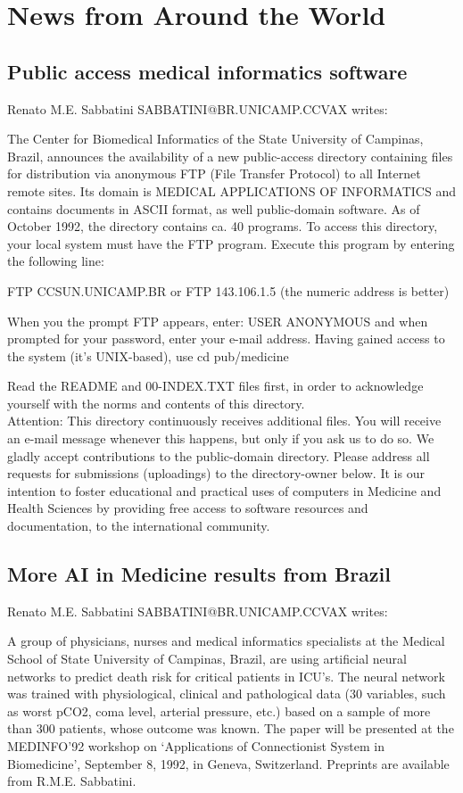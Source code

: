 \section{News from Around the World}
\subsection{Public access medical informatics software}
Renato M.E. Sabbatini SABBATINI@BR.UNICAMP.CCVAX writes:
 
The Center for Biomedical Informatics of the State University of
Campinas, Brazil, announces the availability of a new public-access
directory containing files for distribution via anonymous FTP (File Transfer
Protocol) to all Internet remote sites.
Its domain is MEDICAL APPLICATIONS OF INFORMATICS and contains documents
in ASCII format, as well public-domain software. As of October 1992,
the directory contains ca. 40 programs.
To access this directory, your local system must have the FTP program.
Execute this program by entering the following line:
 
FTP CCSUN.UNICAMP.BR or FTP 143.106.1.5  (the numeric address is better)
 
When you the prompt FTP appears, enter: USER ANONYMOUS
 and when prompted for your password, enter your e-mail address.
Having gained access to the system (it's UNIX-based), use
cd pub/medicine
 
Read the README and 00-INDEX.TXT files first, in order to
acknowledge yourself with the norms and contents of this
directory.\\ 
Attention: This directory continuously receives additional
files. You will receive an e-mail message whenever this
happens, but only if you ask us to do so.
 We gladly accept contributions to the public-domain directory. Please
address all requests for submissions (uploadings) to the directory-owner
below.
It is our intention to foster educational and practical uses of
computers in Medicine and Health Sciences by providing free access to
software resources and documentation, to the international community.

\subsection{More AI in Medicine results from Brazil}
Renato M.E. Sabbatini SABBATINI@BR.UNICAMP.CCVAX writes:

A group of physicians, nurses and medical informatics specialists
at the Medical School of State University of Campinas, Brazil,
are using artificial neural networks to predict death risk
for critical patients in ICU's. The neural network was
trained with physiological, clinical and pathological data
(30 variables, such as worst pCO2, coma level, arterial
pressure, etc.) based on a sample of more than 300 patients,
whose outcome was known.
The paper will be presented at the MEDINFO'92 workshop on
`Applications of Connectionist System in Biomedicine',
September 8, 1992, in Geneva, Switzerland. Preprints are
available from R.M.E. Sabbatini.


